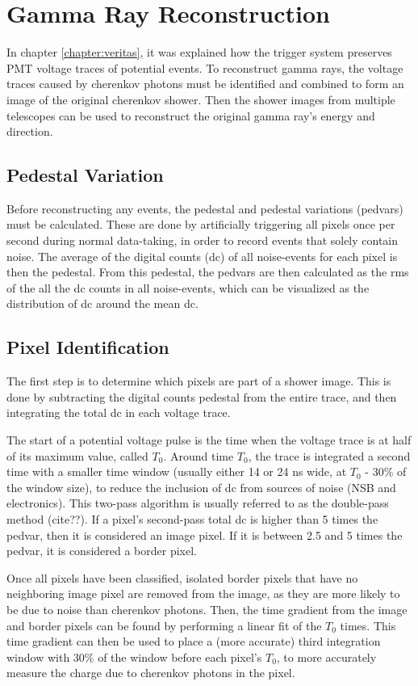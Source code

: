 \cleartooddpage[\thispagestyle{empty}]
\chapter{Gamma Ray Reconstruction}\label{ch:grrecon}

In chapter \ref{chapter:veritas}, it was explained how the trigger system preserves PMT voltage traces of potential events.
To reconstruct gamma rays, the voltage traces caused by cherenkov photons must be identified and combined to form an image of the original cherenkov shower.
Then the shower images from multiple telescopes can be used to reconstruct the original gamma ray's energy and direction.

\section{Pedestal Variation}
Before reconstructing any events, the pedestal and pedestal variations (pedvars) must be calculated.
These are done by artificially triggering all pixels once per second during normal data-taking, in order to record events that solely contain noise.
The average of the digital counts (dc) of all noise-events for each pixel is then the pedestal.
From this pedestal, the pedvars are then calculated as the rms of the all the dc counts in all noise-events, which can be visualized as the distribution of dc around the mean dc.

\section{Pixel Identification}
The first step is to determine which pixels are part of a shower image.
This is done by subtracting the digital counts pedestal from the entire trace, and then integrating the total dc in each voltage trace.

The start of a potential voltage pulse is the time when the voltage trace is at half of its maximum value, called $T_{0}$.
Around time $T_{0}$, the trace is integrated a second time with a smaller time window (usually either 14 or 24 ns wide, at $T_0$ - 30\% of the window size), to reduce the inclusion of dc from sources of noise (NSB and electronics).
This two-pass algorithm is usually referred to as the double-pass method (cite??).
If a pixel's second-pass total dc is higher than 5 times the pedvar, then it is considered an image pixel.
If it is between 2.5 and 5 times the pedvar, it is considered a border pixel.

Once all pixels have been classified, isolated border pixels that have no neighboring image pixel are removed from the image, as they are more likely to be due to noise than cherenkov photons.
Then, the time gradient from the image and border pixels can be found by performing a linear fit of the $T_{0}$ times.
This time gradient can then be used to place a (more accurate) third integration window with 30\% of the window before each pixel's $T_{0}$, to more accurately measure the charge due to cherenkov photons in the pixel.

